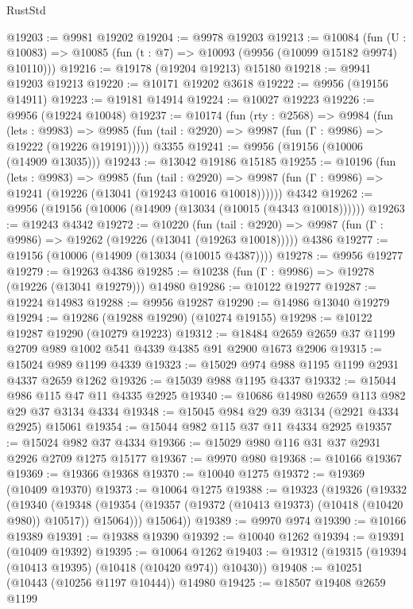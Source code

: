 \begin{lexlean}{RustStd}
\begin{coremodule}
@19203 := @9981 @19202
@19204 := @9978 @19203
@19213 := @10084
    (fun (U : @10083) => @10085 (fun (t : @7) => @10093 (@9956 (@10099 @15182 @9974) @10110)))
@19216 := @19178 (@19204 @19213) @15180
@19218 := @9941 @19203 @19213
@19220 := @10171 @19202 @3618
@19222 := @9956 (@19156 @14911)
@19223 := @19181 @14914
@19224 := @10027 @19223
@19226 := @9956 (@19224 @10048)
@19237 := @10174
    (fun (rty : @2568) =>
    @9984
      (fun (lets : @9983) =>
      @9985 (fun (tail : @2920) => @9987 (fun (Γ : @9986) => @19222 (@19226 @19191)))))
    @3355
@19241 := @9956 (@19156 (@10006 (@14909 @13035)))
@19243 := @13042 @19186 @15185
@19255 := @10196
    (fun (lets : @9983) =>
    @9985
      (fun (tail : @2920) =>
      @9987 (fun (Γ : @9986) => @19241 (@19226 (@13041 (@19243 @10016 @10018))))))
    @4342
@19262 := @9956 (@19156 (@10006 (@14909 (@13034 (@10015 (@4343 @10018))))))
@19263 := @19243 @4342
@19272 := @10220
    (fun (tail : @2920) => @9987 (fun (Γ : @9986) => @19262 (@19226 (@13041 (@19263 @10018)))))
    @4386
@19277 := @19156 (@10006 (@14909 (@13034 (@10015 @4387))))
@19278 := @9956 @19277
@19279 := @19263 @4386
@19285 := @10238 (fun (Γ : @9986) => @19278 (@19226 (@13041 @19279))) @14980
@19286 := @10122 @19277
@19287 := @19224 @14983
@19288 := @9956 @19287
@19290 := @14986 @13040 @19279
@19294 := @19286 (@19288 @19290) (@10274 @19155)
@19298 := @10122 @19287 @19290 (@10279 @19223)
@19312 := @18484 @2659 @2659 @37 @1199 @2709 @989 @1002 @541 @4339 @4385 @91 @2900 @1673 @2906
@19315 := @15024 @989 @1199 @4339
@19323 := @15029 @974 @988 @1195 @1199 @2931 @4337 @2659 @1262
@19326 := @15039 @988 @1195 @4337
@19332 := @15044 @986 @115 @47 @11 @4335 @2925
@19340 := @10686 @14980 @2659 @113 @982 @29 @37 @3134 @4334
@19348 := @15045 @984 @29 @39 @3134 (@2921 @4334 @2925) @15061
@19354 := @15044 @982 @115 @37 @11 @4334 @2925
@19357 := @15024 @982 @37 @4334
@19366 := @15029 @980 @116 @31 @37 @2931 @2926 @2709 @1275 @15177
@19367 := @9970 @980
@19368 := @10166 @19367
@19369 := @19366 @19368
@19370 := @10040 @1275
@19372 := @19369 (@10409 @19370)
@19373 := @10064 @1275
@19388 := @19323
    (@19326
      (@19332
        (@19340
          (@19348 (@19354 (@19357 (@19372 (@10413 @19373) (@10418 (@10420 @980)) @10517)) @15064)))
        @15064))
@19389 := @9970 @974
@19390 := @10166 @19389
@19391 := @19388 @19390
@19392 := @10040 @1262
@19394 := @19391 (@10409 @19392)
@19395 := @10064 @1262
@19403 := @19312 (@19315 (@19394 (@10413 @19395) (@10418 (@10420 @974)) @10430))
@19408 := @10251 (@10443 (@10256 @1197 @10444)) @14980
@19425 := @18507
    @19408
    @2659
    @1199

\end{coremodule}
\end{lexlean}
